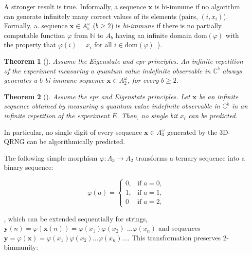 \documentclass[l1pt]{elsarticle}
\newtheorem{theorem}{Theorem}
\newcommand{\bbbn}{\mathbb{N}}
\newcommand{\dom}{\mathrm{dom}}
\newcommand{\x}{\mathbf{x}}
\begin{document}
{A stronger result is true. Informally, a sequence $ \mathbf{x}$ is bi-immune if  no algorithm can generate
infinitely many correct values of its elements (pairs, $(i, x_i)$).
Formally, a.
 sequence $ \mathbf{x}\in A_{b}^{\omega}$  ($b\ge 2$)
 is  {\it bi-immune} if there is no
partially computable function $\varphi$ from $\bbbn $ to $A_{b}$ having an
infinite domain $\dom(\varphi)$ with the property that $\varphi(i)= x_i$ for
all $i\in \dom(\varphi)$~\cite{bienvenu2013}).


\begin{theorem}[\cite{abbott2012strongrandomness,aguero_trejo_new_2021}]
\label{biimm_2}
Assume the  Eigenstate and epr principles. An infinite repetition of the
experiment
measuring  a quantum value indefinite observable  in $\mathbb{C}^{b}$ always generates a
 $b$-bi-immune   sequence $\x\in A_2^{\omega}$, for every $b\ge 2$.
\end{theorem}


\begin{theorem}  [\cite{aguero_trejo_new_2021}]
\label{bunpredict}
Assume the epr and Eigenstate principles.
Let $\x$ be an infinite sequence obtained by measuring a quantum value indefinite observable in $\mathbb{C}^{b}$  in an infinite repetition of the experiment $E$. Then, no single bit $x_i$ can be predicted.
\end{theorem}

In particular, no single digit of every sequence   $\x \in A_3^{\omega}$ generated by the {\rm 3D-QRNG}  can be algorithmically predicted.

The following simple morphism $\varphi \colon A_3 \rightarrow A_2$ transforms a ternary
sequence into a binary sequence:

\begin{equation}
\label{amorph}
\varphi(a)=
\begin{cases}0,&\text{if }a=0,
\\1,&\text{if }a=1,
\\0&\text{if } a=2,\end{cases}
\end{equation}



\noindent, which can be extended sequentially for strings,
  $\mathbf{y}(n)=\varphi(\mathbf{x}(n))= \varphi(x_1)\varphi(x_2)$  $\dots \varphi(x_n)$ and sequences $\mathbf{y}= \varphi(\mathbf{x}) = \varphi(x_1)\varphi(x_2)\dots \varphi(x_n) \dots $. This transformation preserves 2-bimmunity:

}
\end{document}
